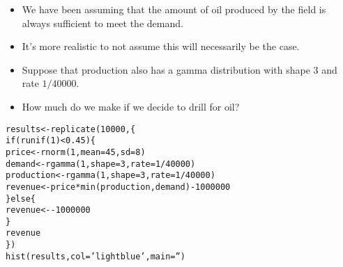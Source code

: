 \documentclass{beamer}\usepackage[]{graphicx}\usepackage[]{color}
\makeatletter
\newcommand{\hlnum}[1]{\textcolor[rgb]{0.824,0.412,0.118}{#1}}%
\newcommand{\hlstr}[1]{\textcolor[rgb]{1,0.894,0.71}{#1}}%
\newcommand{\hlopt}[1]{\textcolor[rgb]{1,0.894,0.769}{#1}}%
\newcommand{\hlstd}[1]{\textcolor[rgb]{1,0.894,0.769}{#1}}%
\newcommand{\hlkwa}[1]{\textcolor[rgb]{0.941,0.902,0.549}{#1}}%
\newcommand{\hlkwb}[1]{\textcolor[rgb]{0.804,0.776,0.451}{#1}}%
\newcommand{\hlkwc}[1]{\textcolor[rgb]{0.78,0.941,0.545}{#1}}%
\newcommand{\hlkwd}[1]{\textcolor[rgb]{1,0.78,0.769}{#1}}%
\newenvironment{kframe}{%
 \def\at@end@of@kframe{}%
 \ifinner\ifhmode%
  \def\at@end@of@kframe{\end{minipage}}%
  \begin{minipage}{\columnwidth}%
 \fi\fi%
 \def\FrameCommand##1{\hskip\@totalleftmargin \hskip-\fboxsep
 \colorbox{shadecolor}{##1}\hskip-\fboxsep
     \hskip-\linewidth \hskip-\@totalleftmargin \hskip\columnwidth}%
 \MakeFramed {\advance\hsize-\width
   \@totalleftmargin\z@ \linewidth\hsize
   \@setminipage}}%
 {\par\unskip\endMakeFramed%
 \at@end@of@kframe}
\newenvironment{knitrout}{}{} %
\makeatother
\begin{document}
\begin{darkframes}
\begin{frame}[fragile]
\begin{knitrout}
\end{knitrout}
    \end{frame}

    \begin{frame}
      \begin{itemize}[<+->]
        \item We have been assuming that the amount of oil produced by the field is always sufficient to meet the demand.
        \item It's more realistic to not assume this will necessarily be the case.
        \item Suppose that production also has a gamma distribution with shape 3 and rate $1/40000$.
        \item How much do we make if we decide to drill for oil?
      \end{itemize}
      \lc
    \end{frame}

    \begin{frame}[fragile]
      \fontsize{9}{9}\selectfont
\begin{knitrout}
\begin{kframe}
\begin{alltt}
\hlstd{results} \hlkwb{<-} \hlkwd{replicate}\hlstd{(}\hlnum{10000}\hlstd{, \{}
  \hlkwa{if} \hlstd{(}\hlkwd{runif}\hlstd{(}\hlnum{1}\hlstd{)} \hlopt{<} \hlnum{0.45}\hlstd{) \{}
    \hlstd{price} \hlkwb{<-} \hlkwd{rnorm}\hlstd{(}\hlnum{1}\hlstd{,} \hlkwc{mean}\hlstd{=}\hlnum{45}\hlstd{,} \hlkwc{sd}\hlstd{=}\hlnum{8}\hlstd{)}
    \hlstd{demand} \hlkwb{<-} \hlkwd{rgamma}\hlstd{(}\hlnum{1}\hlstd{,} \hlkwc{shape}\hlstd{=}\hlnum{3}\hlstd{,} \hlkwc{rate}\hlstd{=}\hlnum{1}\hlopt{/}\hlnum{40000}\hlstd{)}
    \hlstd{production} \hlkwb{<-} \hlkwd{rgamma}\hlstd{(}\hlnum{1}\hlstd{,} \hlkwc{shape}\hlstd{=}\hlnum{3}\hlstd{,} \hlkwc{rate}\hlstd{=}\hlnum{1}\hlopt{/}\hlnum{40000}\hlstd{)}
    \hlstd{revenue} \hlkwb{<-} \hlstd{price} \hlopt{*} \hlkwd{min}\hlstd{(production, demand)} \hlopt{-} \hlnum{1000000}
  \hlstd{\}} \hlkwa{else} \hlstd{\{}
    \hlstd{revenue} \hlkwb{<-} \hlopt{-}\hlnum{1000000}
  \hlstd{\}}
  \hlstd{revenue}
\hlstd{\})}
\hlkwd{hist}\hlstd{(results,} \hlkwc{col}\hlstd{=}\hlstr{'lightblue'}\hlstd{,} \hlkwc{main}\hlstd{=}\hlstr{''}\hlstd{)}
\end{alltt}
\end{kframe}


\end{knitrout}
    \end{frame}
  \end{darkframes}
\end{document}
